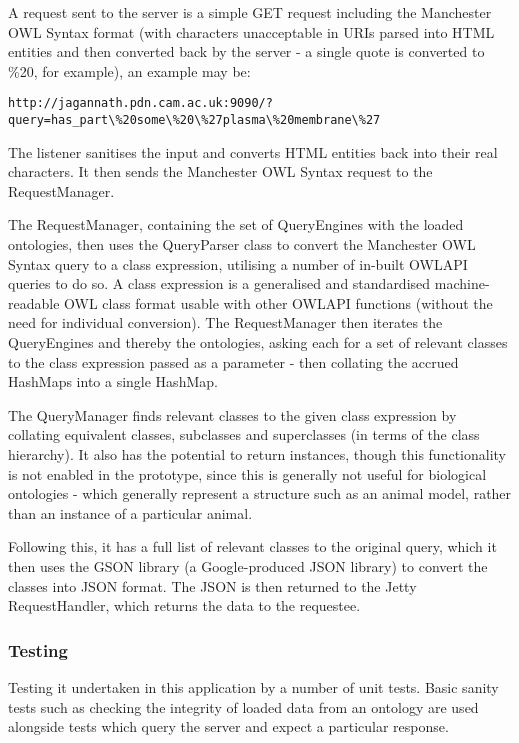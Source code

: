 \documentclass{article}
\begin{document}
A request sent to the server is a simple GET request including the Manchester
OWL Syntax format (with characters unacceptable in URIs parsed into HTML
entities and then converted back by the server - a single quote is converted to
\%20, for example), an example may be:

\begin{lstlisting}
http://jagannath.pdn.cam.ac.uk:9090/?query=has_part\%20some\%20\%27plasma\%20membrane\%27
\end{lstlisting}

The listener sanitises the input and converts HTML entities back into their real
characters. It then sends the Manchester OWL Syntax request to the
RequestManager. 

The RequestManager, containing the set of QueryEngines with the loaded
ontologies, then uses the QueryParser class to convert the Manchester OWL Syntax 
query to a class expression, utilising a number of in-built OWLAPI queries to do
so. A class expression is a generalised and standardised machine-readable OWL
class format usable with other OWLAPI functions (without the need for individual
conversion). The RequestManager then iterates the QueryEngines and thereby the
ontologies, asking each for a set of relevant classes to the class expression
passed as a parameter - then collating the accrued HashMaps into a single
HashMap.

The QueryManager finds relevant classes to the given class expression by
collating equivalent classes, subclasses and superclasses (in terms of the class
hierarchy). It also has the potential to return instances, though this
functionality is not enabled in the prototype, since this is generally not
useful for biological ontologies - which generally represent a structure such as
an animal model, rather than an instance of a particular animal.

Following this, it has a full list of relevant classes to the original query,
which it then uses the GSON library\cite{gson} (a Google-produced JSON library) to convert 
the classes into JSON format. The JSON is then returned to the Jetty
RequestHandler, which returns the data to the requestee.

\subsubsection{Testing}

Testing it undertaken in this application by a number of unit tests. Basic
sanity tests such as checking the integrity of loaded data from an ontology are
used alongside tests which query the server and expect a particular response.
\end{document}

